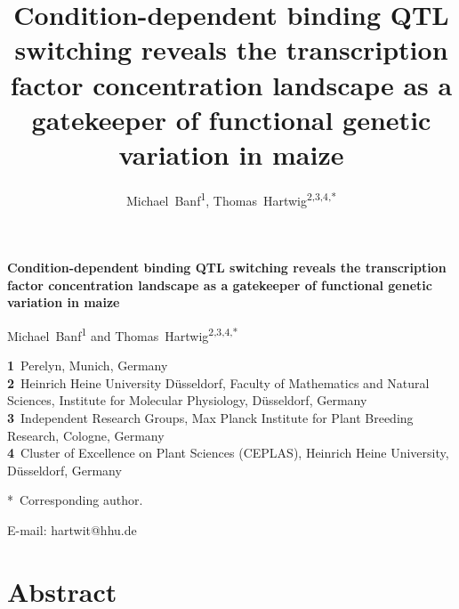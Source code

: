 \documentclass[10pt,letterpaper]{article}
\title{Condition-dependent binding QTL switching reveals the transcription
factor concentration landscape as a gatekeeper of functional
genetic variation in maize}
\author{
Michael~Banf\textsuperscript{1},
Thomas~Hartwig\textsuperscript{2,3,4,*}
}
\date{}
\begin{document}
\vspace*{0.2in}
\begin{flushleft}
{\Large\bfseries\sffamily Condition-dependent binding QTL switching reveals the
transcription factor concentration landscape as a gatekeeper of functional
genetic variation in maize}
\bigskip

\noindent
Michael~Banf\textsuperscript{1} and Thomas~Hartwig\textsuperscript{2,3,4,*}

\bigskip

\noindent
\textbf{1}~Perelyn, Munich, Germany\\
\textbf{2}~Heinrich Heine University D\"usseldorf, Faculty of Mathematics and Natural Sciences, Institute for Molecular Physiology, D\"usseldorf, Germany\\
\textbf{3}~Independent Research Groups, Max Planck Institute for Plant Breeding Research, Cologne, Germany\\
\textbf{4}~Cluster of Excellence on Plant Sciences (CEPLAS), Heinrich Heine University, D\"usseldorf, Germany

\bigskip

\noindent
*~Corresponding author.

\noindent
E-mail: hartwit@hhu.de

\end{flushleft}

\section*{Abstract}
\end{document}
